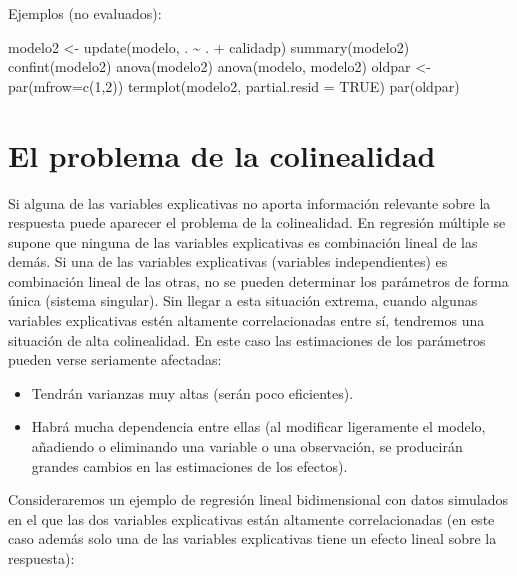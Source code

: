 \documentclass[
]{book}
\newenvironment{Shaded}{\begin{snugshade}}{\end{snugshade}}
\newcommand{\AttributeTok}[1]{\textcolor[rgb]{0.77,0.63,0.00}{#1}}
\newcommand{\ConstantTok}[1]{\textcolor[rgb]{0.00,0.00,0.00}{#1}}
\newcommand{\DecValTok}[1]{\textcolor[rgb]{0.00,0.00,0.81}{#1}}
\newcommand{\FunctionTok}[1]{\textcolor[rgb]{0.00,0.00,0.00}{#1}}
\newcommand{\NormalTok}[1]{#1}
\newcommand{\OtherTok}[1]{\textcolor[rgb]{0.56,0.35,0.01}{#1}}
\newcommand{\SpecialCharTok}[1]{\textcolor[rgb]{0.00,0.00,0.00}{#1}}
\theoremstyle{break}
\theoremstyle{nonumberplain}
\begin{document}
Ejemplos (no evaluados):

\begin{Shaded}
\begin{Highlighting}[]
\NormalTok{modelo2 }\OtherTok{\textless{}{-}} \FunctionTok{update}\NormalTok{(modelo, . }\SpecialCharTok{\textasciitilde{}}\NormalTok{ . }\SpecialCharTok{+}\NormalTok{ calidadp)}
\FunctionTok{summary}\NormalTok{(modelo2)}
\FunctionTok{confint}\NormalTok{(modelo2)}
\FunctionTok{anova}\NormalTok{(modelo2)}
\FunctionTok{anova}\NormalTok{(modelo, modelo2)}
\NormalTok{oldpar }\OtherTok{\textless{}{-}} \FunctionTok{par}\NormalTok{(}\AttributeTok{mfrow=}\FunctionTok{c}\NormalTok{(}\DecValTok{1}\NormalTok{,}\DecValTok{2}\NormalTok{))}
\FunctionTok{termplot}\NormalTok{(modelo2, }\AttributeTok{partial.resid =} \ConstantTok{TRUE}\NormalTok{)}
\FunctionTok{par}\NormalTok{(oldpar)}
\end{Highlighting}
\end{Shaded}

\hypertarget{colinealidad}{%
\section{El problema de la colinealidad}\label{colinealidad}}

Si alguna de las variables explicativas no aporta información relevante sobre la respuesta puede aparecer el problema de la colinealidad.
En regresión múltiple se supone que ninguna de las variables explicativas es combinación lineal de las demás.
Si una de las variables explicativas (variables independientes) es combinación lineal de las otras, no se pueden determinar los parámetros de forma única (sistema singular).
Sin llegar a esta situación extrema, cuando algunas variables explicativas estén altamente correlacionadas entre sí, tendremos una situación de alta colinealidad.
En este caso las estimaciones de los parámetros pueden verse seriamente afectadas:

\begin{itemize}
\item
  Tendrán varianzas muy altas (serán poco eficientes).
\item
  Habrá mucha dependencia entre ellas (al modificar ligeramente el
  modelo, añadiendo o eliminando una variable o una observación,
  se producirán grandes cambios en las estimaciones de los efectos).
\end{itemize}

Consideraremos un ejemplo de regresión lineal bidimensional con datos simulados en el que las dos variables explicativas están altamente correlacionadas (en este caso además solo una de las variables explicativas tiene un efecto lineal sobre la respuesta):
\end{document}
